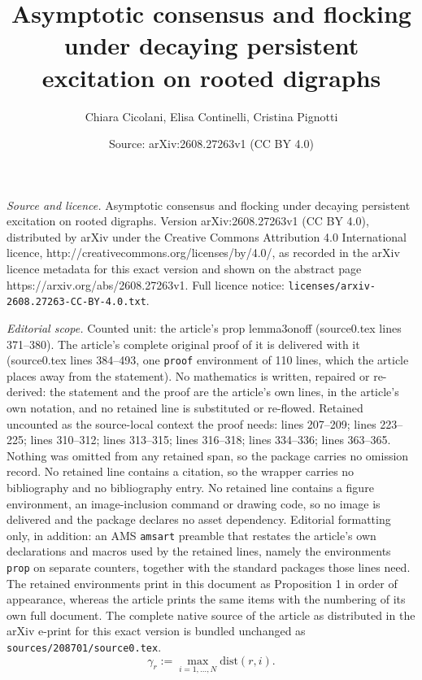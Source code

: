 \documentclass[10pt,a4paper]{amsart}
\title{Asymptotic consensus and flocking under decaying persistent excitation on rooted digraphs}
\author{Chiara Cicolani, Elisa Continelli, Cristina Pignotti}
\date{Source: arXiv:2608.27263v1 (CC BY 4.0)}
\begin{document}
\maketitle

\noindent\emph{Source and licence.} Asymptotic consensus and flocking under decaying persistent excitation on rooted digraphs. Version arXiv:2608.27263v1 (CC BY 4.0), distributed by arXiv under the Creative Commons Attribution 4.0 International licence, http://creativecommons.org/licenses/by/4.0/, as recorded in the arXiv licence metadata for this exact version and shown on the abstract page https://arxiv.org/abs/2608.27263v1. Full licence notice: \texttt{licenses/arxiv-2608.27263-CC-BY-4.0.txt}.\par\smallskip

\noindent\textit{Editorial scope.} Counted unit: the article's prop lemma3onoff (source0.tex lines 371--380). The article's complete original proof of it is delivered with it (source0.tex lines 384--493, one \texttt{proof} environment of 110 lines, which the article places away from the statement). No mathematics is written, repaired or re-derived: the statement and the proof are the article's own lines, in the article's own notation, and no retained line is substituted or re-flowed.  Retained uncounted as the source-local context the proof needs: lines 207--209; lines 223--225; lines 310--312; lines 313--315; lines 316--318; lines 334--336; lines 363--365.  Nothing was omitted from any retained span, so the package carries no omission record.  No retained line contains a citation, so the wrapper carries no bibliography and no bibliography entry.  No retained line contains a figure environment, an image-inclusion command or drawing code, so no image is delivered and the package declares no asset dependency.  Editorial formatting only, in addition: an AMS \texttt{amsart} preamble that restates the article's own declarations and macros used by the retained lines, namely the environments \texttt{prop} on separate counters, together with the standard packages those lines need.  The retained environments print in this document as Proposition 1 in order of appearance, whereas the article prints the same items with the numbering of its own full document.  The complete native source of the article as distributed in the arXiv e-print for this exact version is bundled unchanged as \texttt{sources/208701/source0.tex}.
	\begin{equation}\label{gamma}
		\gamma_r:=\max_{i =1,\dots, N} \text{dist}(r,i). 
	\end{equation}
\end{document}
